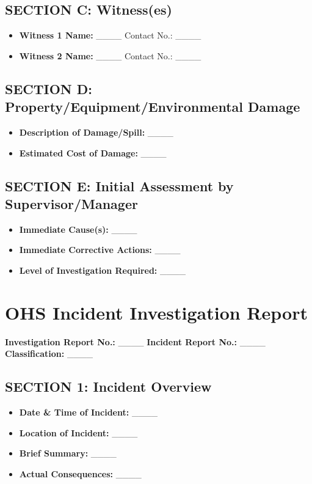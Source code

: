 \documentclass[12pt]{article}
\begin{document}
\subsection{SECTION C: Witness(es)}
\begin{itemize}
    \item \textbf{Witness 1 Name:} \_\_\_\_ Contact No.: \_\_\_\_
    \item \textbf{Witness 2 Name:} \_\_\_\_ Contact No.: \_\_\_\_
\end{itemize}

\subsection{SECTION D: Property/Equipment/Environmental Damage}
\begin{itemize}
    \item \textbf{Description of Damage/Spill:} \_\_\_\_
    \item \textbf{Estimated Cost of Damage:} \_\_\_\_
\end{itemize}

\subsection{SECTION E: Initial Assessment by Supervisor/Manager}
\begin{itemize}
    \item \textbf{Immediate Cause(s):} \_\_\_\_
    \item \textbf{Immediate Corrective Actions:} \_\_\_\_
    \item \textbf{Level of Investigation Required:} \_\_\_\_
\end{itemize}

\section{OHS Incident Investigation Report}

\textbf{Investigation Report No.:} \_\_\_\_ \textbf{Incident Report No.:} \_\_\_\_\\
\textbf{Classification:} \_\_\_\_

\subsection{SECTION 1: Incident Overview}
\begin{itemize}
    \item \textbf{Date \& Time of Incident:} \_\_\_\_
    \item \textbf{Location of Incident:} \_\_\_\_
    \item \textbf{Brief Summary:} \_\_\_\_
    \item \textbf{Actual Consequences:} \_\_\_\_
\end{itemize}
\end{document}
